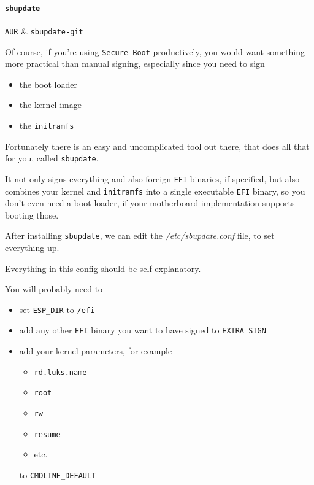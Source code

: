 \documentclass[10pt]{dustdoc}
\begin{document}
\paragraph{\texttt{sbupdate}}
\label{par:sbupdate}

\begin{packagetable}
    \texttt{AUR} & \texttt{sbupdate-git} \\ 
\end{packagetable}

Of course, if you’re using \texttt{Secure Boot} productively, you would want something more practical than manual signing, especially since you need to sign

\begin{itemize}
    \item the boot loader

    \item the kernel image

    \item the \texttt{initramfs}
\end{itemize}

Fortunately there is an easy and uncomplicated tool out there, that does all that for you, called \texttt{sbupdate}.

It not only signs everything and also foreign \texttt{EFI} binaries, if specified, but also combines your kernel and \texttt{initramfs} into a single executable \texttt{EFI} binary, so you don’t even need a boot loader, if your motherboard implementation supports booting those.

After installing \texttt{sbupdate}, we can edit the \textit{/etc/sbupdate.conf} file, to set everything up.

Everything in this config should be self-explanatory.

You will probably need to

\begin{itemize}
    \item set \texttt{ESP\_DIR} to \texttt{/efi}

    \item add any other \texttt{EFI} binary you want to have signed to \texttt{EXTRA\_SIGN}

    \item add your kernel parameters, for example

        \begin{itemize}
            \item \texttt{rd.luks.name}
            \item \texttt{root}
            \item \texttt{rw}
            \item \texttt{resume}
            \item etc.
        \end{itemize}

        \noindent
        to \texttt{CMDLINE\_DEFAULT}
\end{itemize}
\end{document}
